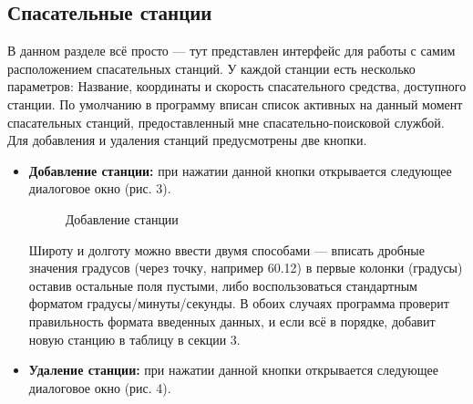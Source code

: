 \documentclass{article}
\begin{document}
\subsection{Спасательные станции} В данном разделе всё просто --- тут представлен интерфейс для работы с самим расположением спасательных станций. У каждой станции есть несколько параметров: Название, координаты и скорость спасательного средства, доступного станции. По умолчанию в программу вписан список активных на данный момент спасательных станций, предоставленный мне спасательно-поисковой службой. Для добавления и удаления станций предусмотрены две кнопки. 
    \begin{itemize}
        \item \textbf{Добавление станции: } при нажатии данной кнопки открывается следующее диалоговое окно (рис. 3).
        \begin{figure}[hbt!]
            \begin{minipage}[h]{\linewidth}
            \end{minipage}
            \caption{Добавление станции}
        \end{figure}
        Широту и долготу можно ввести двумя способами --- вписать дробные значения градусов (через точку, например 60.12) в первые колонки (градусы) оставив остальные поля пустыми, либо воспользоваться стандартным форматом градусы/минуты/секунды. В обоих случаях программа проверит правильность формата введенных данных, и если всё в порядке, добавит новую станцию в таблицу в секции 3.
        \item \textbf{Удаление станции: } при нажатии данной кнопки открывается следующее диалоговое окно (рис. 4).
        \begin{figure}[hbt!]
            \begin{minipage}[h]{\linewidth}

\end{minipage}
\end{figure}
\end{itemize}
\end{document}
